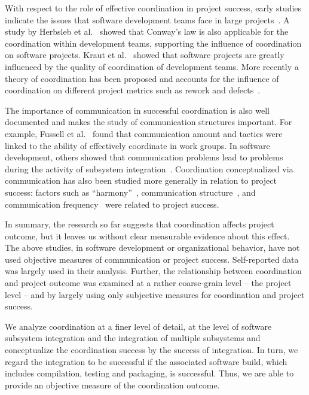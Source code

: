 \documentclass[12pt,oneside]{book}
\begin{document}
With respect to the role of effective coordination in project success, early
studies indicate the issues that software development teams face in large
projects~\cite{curtis:acm:1988}. A study by Herbsleb et
al.~\cite{Herbsleb:1999ew} showed that Conway's law is also applicable for the
coordination within development teams, supporting the influence of coordination
on software projects. Kraut et al.~\cite{kraut:1995coordination} showed that
software projects are greatly influenced by the quality of coordination of
development teams. More recently a theory of coordination has been proposed and
accounts for the influence of coordination on different project metrics such as
rework and defects~\cite{Herbsleb:2006vn}.


The importance of communication in successful coordination is also well
documented and makes the study of communication structures important. For
example, Fussell et al.~\cite{fussell:cscw:1998} found that communication amount and
tactics were linked to the ability of effectively coordinate in work groups. In
software development, others showed that communication problems lead to problems
during the activity of subsystem
integration~\cite{Grinter:1999geography,deSouza2004:thwarts_collaboration}. Coordination
conceptualized via communication has also been studied more generally in relation
to project success: factors such as ``harmony''~\cite{Souder:1988jpim},
communication structure~\cite{Robin:1990jpim}, and communication
frequency~\cite{Griffin:1992ms} were related to project success.

In summary, the research so far suggests that coordination affects project
outcome, but it leaves us without clear measurable evidence about this effect.
The above studies, in software development or organizational behavior, have not
used objective measures of communication or project success. Self-reported data
was largely used in their analysis. Further, the relationship between
coordination and project outcome was examined at a rather coarse-grain level --
the project level -- and by largely using only subjective measures for
coordination and project success.

We analyze coordination at a finer level of detail, at the level of software
subsystem integration and the integration of multiple subsystems and
conceptualize the coordination success by the success of integration. In turn, we
regard the integration to be successful if the associated software build, which
includes compilation, testing and packaging, is successful. Thus, we are able to
provide an objective measure of the coordination outcome.
\end{document}
